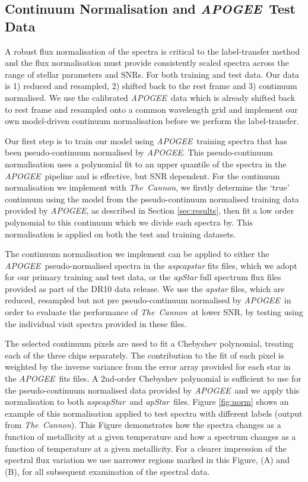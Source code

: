 \documentclass[12pt, preprint]{aastex}
\newcommand{\tc}{\textsl{The~Cannon}}
\newcommand{\apogee}{\textsl{APOGEE}}
\newcommand{\aspcapstar}{\textsl{aspcapStar}}
\newcommand{\apstar}{\textsl{apStar}}
\begin{document}
\subsection{Continuum Normalisation and \apogee\ Test Data}

A robust flux normalisation of the spectra is critical to the label-transfer method and the flux normalisation must provide consistently scaled spectra across the range of stellar parameters and SNRs. For both training and test data. Our data is 1) reduced and resampled, 2) shifted back to the rest frame and 3) continuum normalised.  We use the calibrated \apogee\ data which is already shifted back to rest frame and resampled onto a common wavelength grid and implement our own model-driven continuum normalisation before we perform the label-transfer. 

Our first step is to train our model using \apogee\ training spectra that has been pseudo-continuum normalised by \apogee. This pseudo-continuum normalisation uses a polynomial fit to an upper quantile of the spectra in the \apogee\ pipeline \citep{Meszaros2013} and is effective, but SNR dependent.  For the continuum normalisation we implement with \tc, we firstly determine the  `true' continuum using the model from the pseudo-continuum normalised training data provided by \apogee, as described in Section \ref{sec:results}, then fit a low order polynomial to this continuum which we divide each spectra by. This normalisation is applied on both the test and training datasets. 

The continuum normalisation we implement can be applied to either the \apogee\ pseudo-normalised spectra in the \textit{aspcapstar} fits files, which we adopt for our primary training and test data, or the \textit{apStar} full spectrum flux files provided as part of the DR10 data release. We use the \textit{apstar} files, which are reduced, resampled but not pre pseudo-continuum normalised by \apogee\, in order to evaluate the performance of \tc\ at lower SNR, by testing using the individual visit spectra provided in these files.  

The selected continuum pixels are used to fit a Chebyshev polynomial, treating each of the three chips separately. The contribution to the fit of each pixel is weighted by the inverse variance from the error array provided for each star in the \apogee\ fits files. A 2nd-order Chebyshev polynomial is sufficient to use for the pseudo-continuum normalised data provided by \apogee\ and we apply this normalisation to both \aspcapstar\ and  \apstar\ files.  Figure \ref{fig:norm} shows an example of this normalisation applied to test spectra with different labels (output from \tc). This Figure demonstrates how the spectra changes as a function of metallicity at a given temperature and how a spectrum changes as a function of temperature at a given metallicity. For a clearer impression of the spectral flux variation we use narrower regions marked in this Figure, (A) and (B), for all subsequent examination of the spectral data. 
\end{document}
